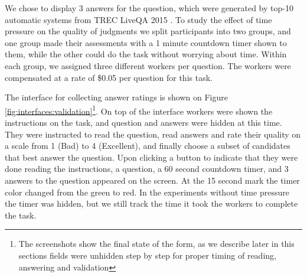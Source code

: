 \documentclass[11pt,letterpaper]{article}
\begin{document}
We chose to display 3 answers for the question, which were generated by top-10 automatic systems from TREC LiveQA 2015 \cite{overviewliveqa15}.
To study the effect of time pressure on the quality of judgments we split participants into two groups, and one group made their assessments with a 1 minute countdown timer shown to them, while the other could do the task without worrying about time.
Within each group, we assigned three different workers per question.
The workers were compensated at a rate of \$0.05 per question for this task.

The interface for collecting answer ratings is shown on Figure \ref{fig:interfaces:validation}\footnote{The screenshots show the final state of the form, as we describe later in this sections fields were unhidden step by step for proper timing of reading, answering and validation}.
On top of the interface workers were shown the instructions on the task, and question and answers were hidden at this time.
They were instructed to read the question, read answers and rate their quality on a scale from 1 (Bad) to 4 (Excellent), and finally choose a subset of candidates that best answer the question.
Upon clicking a button to indicate that they were done reading the instructions, a question, a 60 second countdown timer, and 3 answers to the question appeared on the screen.
At the 15 second mark the timer color changed from the green to red.
In the experiments without time pressure the timer was hidden, but we still track the time it took the workers to complete the task.
\end{document}

